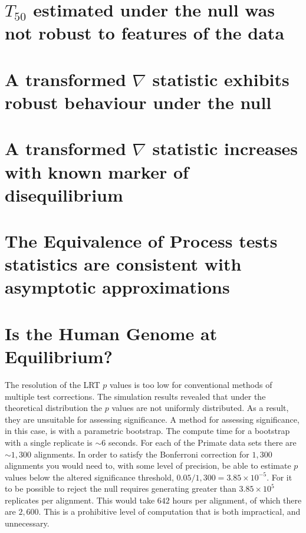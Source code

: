 \section{$T_{50}$ estimated under the null was not robust to features of the data}

% 

\section{A transformed $\nabla$ statistic exhibits robust behaviour under the null}

% 

\section{A transformed $\nabla$ statistic increases with known marker of disequilibrium}

 
\section{The Equivalence of Process tests statistics are consistent with asymptotic approximations}




% 







\section{Is the Human Genome at Equilibrium?}




The resolution of the LRT $p$ values is too low for conventional methods of multiple test corrections. The simulation results revealed that under the theoretical distribution the $p$ values are not uniformly distributed. As a result, they are unsuitable for assessing significance. A method for assessing significance, in this case, is with a parametric bootstrap. The compute time for a bootstrap with a single replicate is ${\sim} 6$ seconds. For each of the Primate data sets there are ${\sim} 1,300$ alignments. In order to satisfy the Bonferroni correction for $1,300$ alignments you would need to, with some level of precision, be able to estimate $p$ values below the altered significance threshold, $0.05/1,300 = 3.85{\times}10^{-5}$. For it to be possible to reject the null requires generating greater than $3.85{\times}10^{5}$ replicates per alignment. This would take $642$ hours per alignment, of which there are $2,600$. This is a prohibitive level of computation that is both impractical, and unnecessary. 

